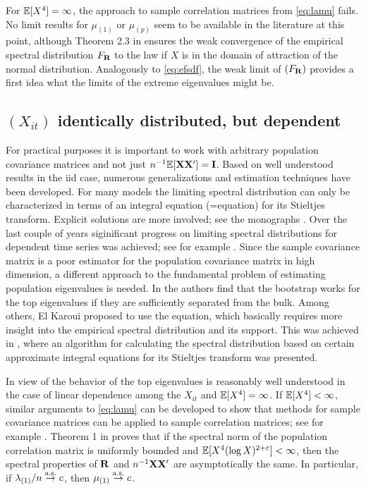 For $\mathbb{E}[X^4]=\infty$, the approach to sample correlation matrices from \eqref{eq:lamu} fails. No limit results for $\mu_{(1)}$ or $\mu_{(p)}$ seem to be available in the literature at this point, although Theorem 2.3 in \cite{bai:zhou:2008} ensures the weak convergence of the empirical spectral distribution $F_{{\mathbf R}}$ to the \MP law if $X$ is in the domain of attraction of the normal distribution. Analogously to \eqref{eq:efsdf}, the weak limit of $(F_{{\mathbf R}})$ provides a first idea what the limits of the extreme eigenvalues might be. 

\subsection{$(X_{it})$ identically distributed, but dependent}
For practical purposes it is important to work with arbitrary population covariance matrices and not just $n^{-1} \mathbb{E}[{\mathbf X}{\mathbf X}']={\mathbf I}$. Based on well understood results in the iid case, numerous generalizations and estimation techniques have been developed. For many models the limiting spectral distribution can only be characterized in terms of an integral equation (=\MP equation) for its Stieltjes transform. Explicit solutions are more involved; see the monographs \cite{bai:silverstein:2010,bai:fang:liang:2014,yao:zheng:bai:2015}. Over the last couple of years siginificant progress on limiting spectral distributions for dependent time series was achieved; see for example %
\cite{banna:merlevede:peligrad:2015,banna:merlevede:2015,banna:2016}.
Since the sample covariance matrix is a poor estimator for the population covariance matrix in high dimension, a different approach to the fundamental problem of estimating population eigenvalues is needed. In \cite{elkaroui:purdom:2016} the authors find that the bootstrap works for the top eigenvalues if they are sufficiently separated from the bulk. Among others, El Karoui \cite{elkaroui:2008} proposed to use the \MP equation, which basically requires more insight into the empirical spectral distribution and its support. This was achieved in \cite{dobriban:2015}, where an algorithm for calculating the spectral distribution based on certain approximate integral equations for its Stieltjes transform was presented.

In view of \cite{davis:pfaffel:stelzer:2014,davis:mikosch:pfaffel:2015,davis:mikosch:heiny:xie:2015} the behavior of the top eigenvalues is reasonably well understood in the case of linear dependence among the $X_{it}$ and $\mathbb{E}[X^4]=\infty$. 
If $\mathbb{E}[X^4]<\infty$, similar arguments to \eqref{eq:lamu} can be developed to show that methods for sample covariance matrices can be applied to sample correlation matrices; see for example \cite{elkaroui:2009}. Theorem 1 in \cite{elkaroui:2009} proves that if the spectral norm of the population correlation matrix is uniformly bounded and $\mathbb{E}[X^4 (\log X)^{2+\varepsilon}]<\infty$, then the spectral properties of ${\mathbf R}$ and $n^{-1} {\mathbf X}{\mathbf X}'$ are asymptotically the same. In particular, if $\lambda_{(1)}/n\stackrel{\rm a.s.}{\rightarrow} c$, then $\mu_{(1)}\stackrel{\rm a.s.}{\rightarrow} c$.

